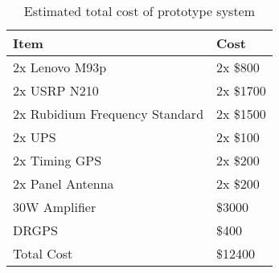 \begin{table}[h!]
\begin{center}
\begin{tabular}{l|l}
Item & Cost \\ \hline
2x Lenovo M93p & 2x \$800 \\
2x USRP N210 & 2x \$1700 \\
2x Rubidium Frequency Standard & 2x \$1500 \\
2x UPS & 2x \$100 \\
2x Timing GPS & 2x \$200\\
2x Panel Antenna & 2x \$200 \\
30W Amplifier & \$3000 \\
DRGPS & \$400 \\\hline
Total Cost & \$12400
\end{tabular}
\end{center}
\caption{\label{tab:total_cost} Estimated total cost of prototype system}
\end{table}
